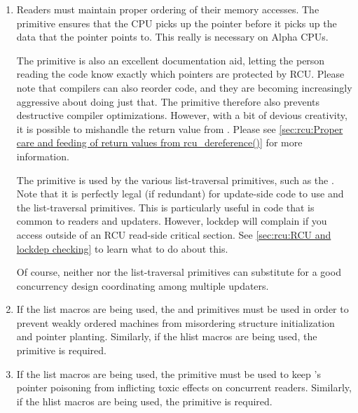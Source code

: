 \begin{enumerate}[start=0]
	\begin{enumerate}
	\item	Readers must maintain proper ordering of their memory
		accesses.
		The  primitive ensures that
		the CPU picks up the pointer before it picks up the data
		that the pointer points to.
		This really is necessary
		on Alpha CPUs.

		The  primitive is also an excellent
		documentation aid, letting the person reading the
		code know exactly which pointers are protected by RCU\@.
		Please note that compilers can also reorder code, and
		they are becoming increasingly aggressive about doing
		just that.
		The  primitive therefore also
		prevents destructive compiler optimizations.
		However,
		with a bit of devious creativity, it is possible to
		mishandle the return value from .
		Please see
		\cref{sec:rcu:Proper care and feeding of return values from rcu_dereference()}
		for more information.

		The  primitive is used by the
		various  list-traversal primitives, such
		as the .
		Note that it is
		perfectly legal (if redundant) for update-side code to
		use  and the  list-traversal
		primitives.
		This is particularly useful in code that
		is common to readers and updaters.
		However, lockdep
		will complain if you access  outside
		of an RCU read-side critical section.
		See \cref{sec:rcu:RCU and lockdep checking}
		to learn what to do about this.

		Of course, neither  nor the 
		list-traversal primitives can substitute for a good
		concurrency design coordinating among multiple updaters.

	\item	If the list macros are being used, the 
		and  primitives must be used in order
		to prevent weakly ordered machines from misordering
		structure initialization and pointer planting.
		Similarly, if the hlist macros are being used, the
		 primitive is required.

	\item	If the list macros are being used, the 
		primitive must be used to keep 's pointer
		poisoning from inflicting toxic effects on concurrent
		readers.
		Similarly, if the hlist macros are being used,
		the  primitive is required.


\end{enumerate}
\end{enumerate}
